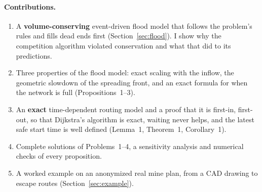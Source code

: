 \documentclass[11pt,a4paper]{article}
\theoremstyle{remark}
\begin{document}
\paragraph{Contributions.}
\begin{enumerate}[leftmargin=2em, itemsep=1pt, topsep=2pt]
  \item A \textbf{volume-conserving} event-driven flood model that follows the problem's rules and fills dead ends first (Section~\ref{sec:flood}). I show why the competition algorithm violated conservation and what that did to its predictions.
  \item Three properties of the flood model: exact scaling with the inflow, the geometric slowdown of the spreading front, and an exact formula for when the network is full (Propositions~1--3).
  \item An \textbf{exact} time-dependent routing model and a proof that it is first-in, first-out, so that Dijkstra's algorithm is exact, waiting never helps, and the latest safe start time is well defined (Lemma~1, Theorem~1, Corollary~1).
  \item Complete solutions of Problems~1--4, a sensitivity analysis and numerical checks of every proposition.
  \item A worked example on an anonymized real mine plan, from a CAD drawing to escape routes (Section~\ref{sec:example}).
\end{enumerate}
\end{document}
